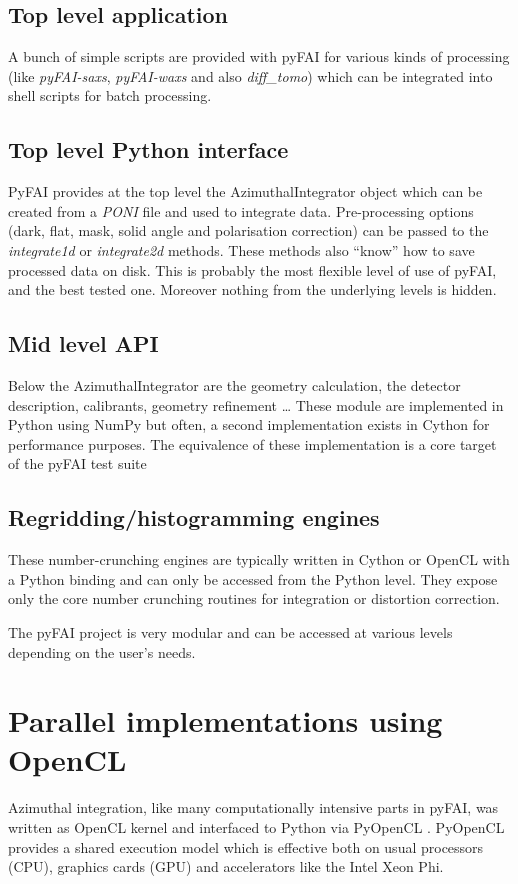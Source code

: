 \documentclass{iucr}
\begin{document}
\subsection{Top level application}
A bunch of simple scripts are provided with pyFAI for various kinds of
processing (like \textit{pyFAI-saxs},  \textit{pyFAI-waxs} and also \textit{diff\_tomo}) 
which can be integrated into shell scripts for batch
processing. 

\subsection{Top level Python interface}
PyFAI provides at the top level the AzimuthalIntegrator object which can be
created from a \textit{PONI} file and used to integrate data. 
Pre-processing options
(dark, flat, mask, solid angle and polarisation correction) can be passed to
the \textit{integrate1d} or \textit{integrate2d} methods.
These methods also ``know'' how to save processed data on disk.
This is probably the most flexible level of use of pyFAI, and the best tested
one. Moreover nothing from the underlying levels is hidden.

\subsection{Mid level API}
Below the AzimuthalIntegrator are the geometry calculation, the detector
description, calibrants, geometry refinement \ldots 
These module are
implemented in Python using NumPy but often, a second
implementation exists in Cython for performance purposes.
The equivalence of these implementation is a core target of the pyFAI test
suite

\subsection{Regridding/histogramming engines}
These number-crunching engines are typically written in Cython or OpenCL with a
Python binding and can only be accessed from the Python level. 
They expose only the core number crunching routines for integration or
distortion correction.

The pyFAI project is very modular and can be accessed at various
levels depending on the user's needs.

\section{Parallel implementations using OpenCL}
\label{annex_opencl}
Azimuthal integration, like  many computationally intensive parts in pyFAI,
was written as OpenCL kernel and interfaced to Python via PyOpenCL
\cite{pyopencl}.
PyOpenCL provides a shared execution model which is effective both on
usual processors (CPU), graphics cards (GPU) and accelerators like the Intel
Xeon Phi.
\end{document}
